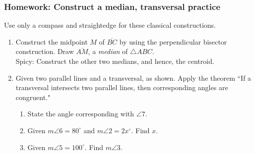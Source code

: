 \documentclass[12pt, oneside]{article}
\begin{document}
\subsubsection*{Homework: Construct a median, transversal practice}
Use only a compass and straightedge for these classical constructions.
  \begin{enumerate}

  \item Construct the midpoint $M$ of $\overline{BC}$ by using the perpendicular bisector construction. Draw $\overline{AM}$, a \emph{median} of $\triangle ABC$.\\
  Spicy: Construct the other two medians, and hence, the centroid.
    \vspace{1cm}
    \begin{center}
  \end{center} \vspace{1.5cm}

  \item Given two parallel lines and a transversal, as shown. Apply the theorem ``If a transversal intersects two parallel lines, then corresponding angles are congruent."
  \begin{center}
  \end{center}
    \begin{enumerate}
      \item State the angle corresponding with $\angle 7$. \bigskip
      \item Given $m\angle 6 = 80^\circ$ and $m\angle 2 = 2x^\circ$. Find $x$. \bigskip
      \item Given $m\angle 5 = 100^\circ$. Find $m\angle 3$.
    \end{enumerate}


\end{enumerate}
\end{document}
